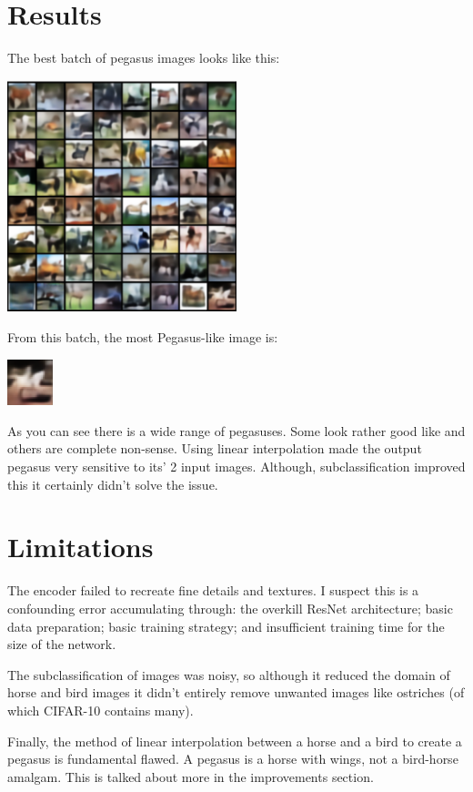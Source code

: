 \documentclass{article}
\begin{document}
\section{Results}
The best batch of pegasus images looks like this:
\begin{center}
    \includegraphics[width=0.5\textwidth]{figures/64_cropped.png}
\end{center}
From this batch, the most Pegasus-like image is:
\begin{center}
    \includegraphics[width=0.1\textwidth]{figures/1_cropped.png}
\end{center}

As you can see there is a wide range of pegasuses. Some look rather good like and others are complete non-sense. Using linear interpolation made the output pegasus very sensitive to its' 2 input images. Although, subclassification improved this it certainly didn't solve the issue.  

\section{Limitations}
The encoder failed to recreate fine details and textures. I suspect this is a confounding error accumulating through: the overkill ResNet architecture; basic data preparation; basic training strategy; and insufficient training time for the size of the network.

The subclassification of images was noisy, so although it reduced the domain of horse and bird images it didn't entirely remove unwanted images like ostriches (of which CIFAR-10 contains many). 

Finally, the method of linear interpolation between a horse and a bird to create a pegasus is fundamental flawed. A pegasus is a horse with wings, not a bird-horse amalgam. This is talked about more in the improvements section.  
\end{document}
